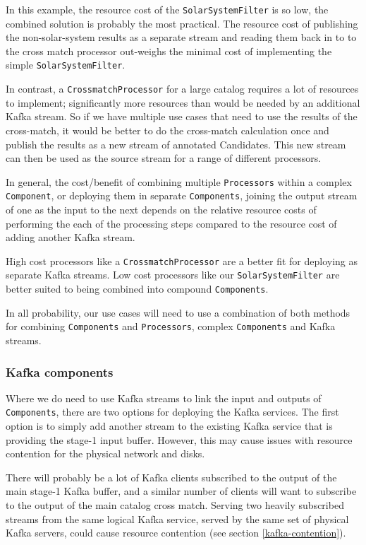 \documentclass{article}
\newcommand{\kafka} {Kafka\xspace}
\newcommand{\stageone} {stage-1\xspace}
\begin{document}
In this example, the resource cost of the \texttt{SolarSystemFilter} is so low, the combined solution is probably the most practical. The resource cost of publishing the non-solar-system results as a separate stream and reading them back in to to the cross match processor out-weighs the minimal cost of implementing the simple \texttt{SolarSystemFilter}.

In contrast, a \texttt{CrossmatchProcessor} for a large catalog requires a lot of resources to implement; significantly more resources than would be needed by an additional \kafka stream. So if we have multiple use cases that need to use the results of the cross-match, it would be better to do the cross-match calculation once and publish the results as a new stream of annotated Candidates. This new stream can then be used as the source stream for a range of different
processors.

In general, the cost/benefit of combining multiple \texttt{Processors} within a complex \texttt{Component}, or deploying them in separate \texttt{Components}, joining the output stream of one as the input to the next depends on the relative resource costs of performing the each of the processing steps compared to the resource cost of adding another Kafka stream.

High cost processors like a \texttt{CrossmatchProcessor} are a better fit for deploying as separate Kafka streams. Low cost processors like our \texttt{SolarSystemFilter} are better suited to being combined into compound \texttt{Components}.

In all probability, our use cases will need to use a combination of both methods for combining \texttt{Components} and \texttt{Processors}, complex \texttt{Components} and \kafka streams.

\subsubsection{Kafka components}
\label{workflow.kafka-components}

Where we do need to use \kafka streams to link the input and outputs of \texttt{Components}, there are two options for deploying the \kafka services. 
The first option is to simply add another stream to the existing \kafka service that is providing the \stageone input buffer. However, this may cause issues with resource contention for the physical network and disks.

There will probably be a lot of \kafka clients subscribed to the output of the main \stageone \kafka buffer, and a similar number of clients will want to subscribe to the output of the main catalog cross match. Serving two heavily subscribed streams from the same logical \kafka service, served by the same set of physical \kafka servers, could cause resource contention (see section \ref{kafka-contention}).
\end{document}

